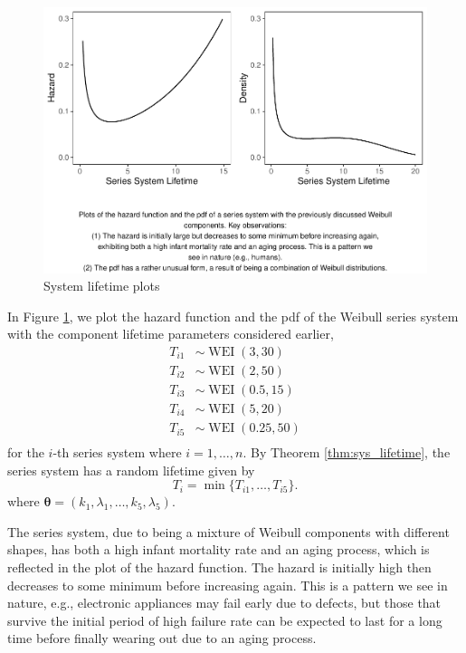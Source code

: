 \documentclass[
]{article}
\begin{document}
\begin{figure}

{\centering \includegraphics{wei_series_md_files/figure-latex/series_haz_pdf-1} 

}

\caption{System lifetime plots}\label{fig:series_haz_pdf}
\end{figure}

In Figure \ref{fig:series_haz_pdf}, we plot the hazard function and the
pdf of the Weibull series system with the component lifetime parameters
considered earlier, \begin{align*}
T_{i 1} &\sim \operatorname{WEI}(3,30)\\
T_{i 2} &\sim \operatorname{WEI}(2,50)\\
T_{i 3} &\sim \operatorname{WEI}(0.5,15)\\
T_{i 4} &\sim \operatorname{WEI}(5,20)\\
T_{i 5} &\sim \operatorname{WEI}(0.25,50)\\
\end{align*} for the \(i\)-th series system where \(i=1,\ldots,n\). By
Theorem \ref{thm:sys_lifetime}, the series system has a random lifetime
given by \[
T_i = \operatorname{min}\{T_{i 1},\ldots,T_{i 5}\}.
\] where \(\boldsymbol{\theta }= (k_1,\lambda_1,\ldots,k_5,\lambda_5)\).

The series system, due to being a mixture of Weibull components with
different shapes, has both a high infant mortality rate and an aging
process, which is reflected in the plot of the hazard function. The
hazard is initially high then decreases to some minimum before
increasing again. This is a pattern we see in nature, e.g., electronic
appliances may fail early due to defects, but those that survive the
initial period of high failure rate can be expected to last for a long
time before finally wearing out due to an aging process.
\end{document}
